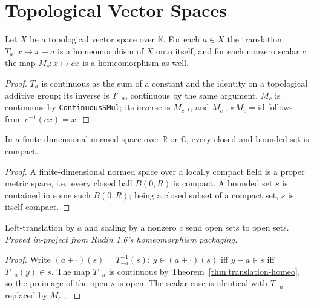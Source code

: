 
\chapter{Topological Vector Spaces}

\begin{theorem}[Rudin 1.6]
  \label{thm:translation-homeo}
  \leanok
  Let $X$ be a topological vector space over $\mathbb{K}$.
  For each $a \in X$ the translation $T_a\colon x \mapsto x + a$
  is a homeomorphism of $X$ onto itself, and for each nonzero
  scalar $c$ the map $M_c\colon x \mapsto cx$ is a homeomorphism as well.
\end{theorem}
\begin{proof}
  \leanok
  $T_a$ is continuous as the sum of a constant and the identity on a
  topological additive group; its inverse is $T_{-a}$, continuous by the
  same argument. $M_c$ is continuous by \texttt{ContinuousSMul}; its
  inverse is $M_{c^{-1}}$, and
  $M_{c^{-1}}\circ M_c = \mathrm{id}$ follows from $c^{-1}(c x) = x$.
\end{proof}

\begin{theorem}
  \label{thm:heine-borel}
  \leanok
  In a finite-dimensional normed space over $\mathbb{R}$ or $\mathbb{C}$,
  every closed and bounded set is compact.
\end{theorem}
\begin{proof}
  \leanok
  A finite-dimensional normed space over a locally compact field is a
  proper metric space, i.e.\ every closed ball $\overline{B}(0, R)$ is
  compact. A bounded set $s$ is contained in some such $\overline{B}(0, R)$;
  being a closed subset of a compact set, $s$ is itself compact.
\end{proof}

\begin{theorem}
  \label{thm:translation-preserves-open}
  \leanok
  Left-translation by $a$ and scaling by a nonzero $c$ send open sets
  to open sets. \emph{Proved in-project from Rudin 1.6's
  homeomorphism packaging.}
\end{theorem}
\begin{proof}
  \leanok
  Write $(a + \cdot)(s) = T_{-a}^{-1}(s)$: $y \in (a + \cdot)(s)$ iff
  $y - a \in s$ iff $T_{-a}(y) \in s$. The map $T_{-a}$ is continuous by
  Theorem~\ref{thm:translation-homeo}, so the preimage of the open $s$ is
  open. The scalar case is identical with $T_{-a}$ replaced by
  $M_{c^{-1}}$.
\end{proof}

